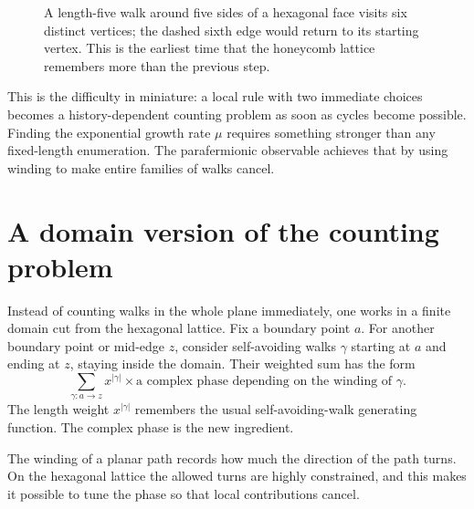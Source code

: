 \begin{figure}[H]
\centering
{}
\caption{A length-five walk around five sides of a hexagonal face visits six distinct vertices; the dashed sixth edge would return to its starting vertex. This is the earliest time that the honeycomb lattice remembers more than the previous step.}
\end{figure}

This is the difficulty in miniature: a local rule with two immediate choices becomes a history-dependent counting problem as soon as cycles become possible. Finding the exponential growth rate $\mu$ requires something stronger than any fixed-length enumeration. The parafermionic observable achieves that by using winding to make entire families of walks cancel.

\section{A domain version of the counting problem}

Instead of counting walks in the whole plane immediately, one works in a finite domain cut from the hexagonal lattice.  Fix a boundary point \(a\).  For another boundary point or mid-edge \(z\), consider self-avoiding walks \(\gamma\) starting at \(a\) and ending at \(z\), staying inside the domain.  Their weighted sum has the form
\[
  \sum_{\gamma:a\to z} x^{|\gamma|} \times \text{a complex phase depending on the winding of }\gamma.
\]
The length weight \(x^{|\gamma|}\) remembers the usual self-avoiding-walk generating function.  The complex phase is the new ingredient.

The winding of a planar path records how much the direction of the path turns.  On the hexagonal lattice the allowed turns are highly constrained, and this makes it possible to tune the phase so that local contributions cancel.


